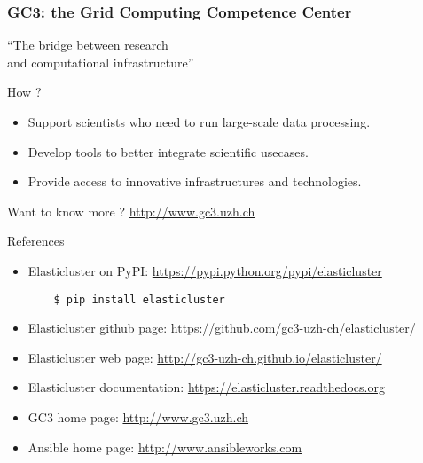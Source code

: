 \documentclass[english,serif,mathserif,usenames,dvipsnames]{beamer}
\begin{document}
\begin{frame}
  \frametitle{GC3: the Grid Computing Competence Center}
    
  \begin{block}{}
     \begin{center}
       \large {\color{Blue}``The bridge between research \\ and computational infrastructure''}
     \end{center}
  \end{block} 

  \begin{block}{How ?}
    \begin{itemize}
    \item {\color{Blue}Support} scientists who need to run large-scale data processing. \\
    \item {\color{Blue}Develop} tools to better {\color{Blue}integrate} scientific usecases.
    \item Provide access to {\color{Blue}innovative} infrastructures and technologies. \\
    \end{itemize}
  \end{block}
  
  \begin{block}{}
    {\color{Blue}\small{Want to know more ? }\url{http://www.gc3.uzh.ch}}
  \end{block}
  
\end{frame}

\begin{frame}[fragile]
  {References}
  \begin{itemize}
  \item Elasticluster on PyPI:
    \url{https://pypi.python.org/pypi/elasticluster}

\begin{verbatim}
    $ pip install elasticluster
\end{verbatim}

  \item Elasticluster github page: 
    \url{https://github.com/gc3-uzh-ch/elasticluster/}
  \item Elasticluster web page: 
    \url{http://gc3-uzh-ch.github.io/elasticluster/}
  \item Elasticluster documentation:
    \url{https://elasticluster.readthedocs.org}
  \item GC3 home page: \url{http://www.gc3.uzh.ch}
  \item Ansible home page: \url{http://www.ansibleworks.com}
  \end{itemize}
\end{frame}
\end{document}
